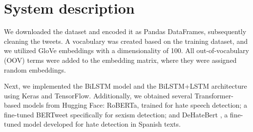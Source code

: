 \documentclass[11pt]{article}
\begin{document}




\section{System description}
\label{sec:system}
We downloaded the dataset and encoded it as Pandas DataFrames, subsequently cleaning the tweets. A vocabulary was created based on the training dataset, and we utilized GloVe embeddings \cite{pennington-etal-2014-glove} with a dimensionality of 100. All out-of-vocabulary (OOV) terms were added to the embedding matrix, where they were assigned random embeddings.

Next, we implemented the BiLSTM model and the BiLSTM+LSTM architecture using Keras and TensorFlow. Additionally, we obtained several Transformer-based models from Hugging Face: RoBERTa, trained for hate speech detection; a fine-tuned BERTweet \cite{2020.emnlp-demos.2} specifically for sexism detection; and DeHateBert \cite{arXiv:2004.06465}, a fine-tuned model developed for hate detection in Spanish texts.


\end{document}
